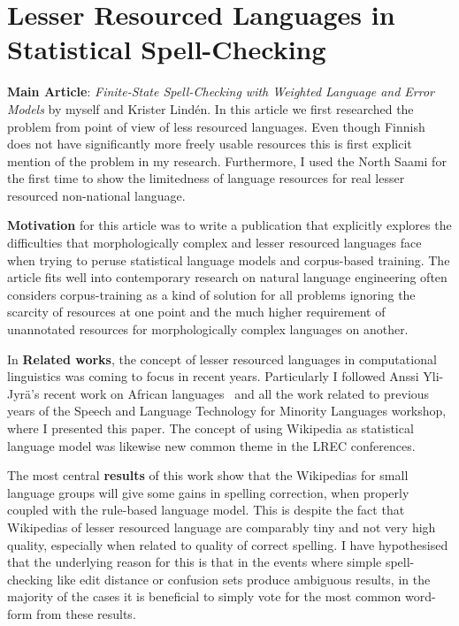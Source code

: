 \documentclass[officiallayout,draft]{unihelcompling}
\begin{document}
\section{Lesser Resourced Languages in Statistical Spell-Checking}
\label{sec:lesser-training}

\textbf{Main Article}: \emph{Finite-State Spell-Checking with Weighted Language
and Error Models} by myself and Krister Lindén. In this article we first
researched the problem from point of view of less resourced languages. Even
though Finnish does not have significantly more freely usable resources this
is first explicit mention of the problem in my research. Furthermore, I
used the North Saami for the first time to show the limitedness of language
resources for real lesser resourced non-national language.

\textbf{Motivation} for this article was to write a publication that explicitly
explores the difficulties that morphologically complex and lesser resourced
languages face when trying to peruse statistical language models and
corpus-based training. The article fits well into contemporary research on
natural language engineering often considers corpus-training as a kind of
solution for all problems ignoring the scarcity of resources at one point and
the much higher requirement of unannotated resources for morphologically
complex languages on another.

In \textbf{Related works}, the concept of lesser resourced languages in
computational linguistics was coming to focus in recent years. Particularly I
followed Anssi Yli-Jyrä's recent work on African
languages~\citep{yli2005toward} and all the work related to previous years of
the Speech and Language Technology for Minority Languages workshop, where I
presented this paper.  The concept of using Wikipedia as statistical language
model was likewise new common theme in the LREC conferences.

The most central \textbf{results} of this work show that the Wikipedias for
small language groups will give some gains in spelling correction, when
properly coupled with the rule-based language model. This is despite the fact
that Wikipedias of lesser resourced language are comparably tiny and not very
high quality, especially when related to quality of correct spelling.  I have
hypothesised that the underlying reason for this is that in the events where
simple spell-checking like edit distance or confusion sets produce ambiguous
results, in the majority of the cases it is beneficial to simply vote for the
most common word-form from these results.
\end{document}
